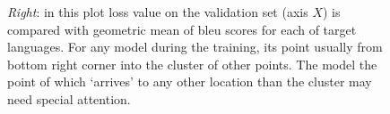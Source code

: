 \begin{figure}[h]
{		\emph{Right}: in this plot loss value on the validation set (axis $X$)
		is compared with geometric mean of \acrshort{bleu} scores
		for each of target languages.
		For any model during the training, its point usually  from
		bottom right corner into the cluster of other points.
		The model the point of which `arrives' to any other location than
		the cluster may need special attention.
	}
	\label{fig:inspect-convergence}
\end{figure}


\cleardoublepage
